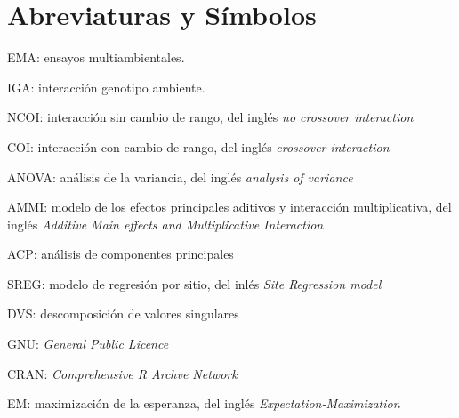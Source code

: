 

\chapter*{Abreviaturas y Símbolos}
\begin{description}

\item{EMA}: ensayos multiambientales.
\item{IGA}: interacción genotipo ambiente.
\item{NCOI}: interacción sin cambio de rango, del inglés \emph{no crossover interaction}
\item{COI}:  interacción con cambio de rango, del inglés \emph{crossover interaction}
\item{ANOVA}: análisis de la variancia, del inglés \emph{analysis of variance}
\item{AMMI}: modelo de los efectos principales aditivos y interacción multiplicativa, del inglés \emph{Additive Main effects and Multiplicative Interaction}
\item{ACP}: análisis de componentes principales
\item{SREG}: modelo de regresión por sitio, del inlés \emph{Site Regression model}
\item{DVS}: descomposición de valores singulares
\item{GNU}: \emph{General Public Licence}
\item{CRAN}: \emph{Comprehensive R Archve Network}
\item{EM}: maximización de la esperanza, del inglés \emph{Expectation-Maximization}
\end{description}
